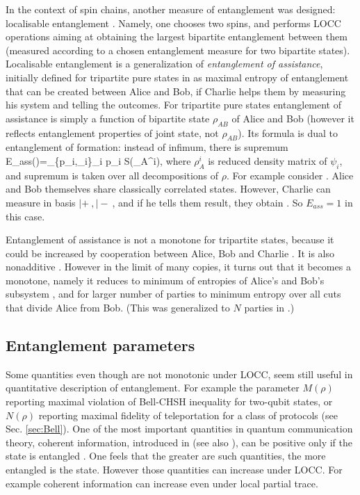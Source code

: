 \documentclass[twocolumn,aps,rmp]{revtex4}
\begin{document}
In the context of spin chains, another measure of entanglement was
designed: localisable entanglement \cite{VerstraetePC2003-locent}. Namely,
one chooses two spins,
and  performs LOCC operations aiming at obtaining the largest
bipartite entanglement between them (measured according to a chosen
entanglement measure for two bipartite states). Localisable
entanglement is a generalization of {\it entanglement of
assistance}, initially defined for tripartite pure states in
\cite{entass} as maximal entropy of entanglement that can be created
between Alice and Bob, if Charlie helps them by measuring his system
and telling the outcomes. For tripartite pure states entanglement of
assistance is simply a function of bipartite state $\rho_{AB}$ of
Alice and Bob (however it reflects entanglement properties of joint
state, not $\rho_{AB}$). Its formula is dual to entanglement of
formation: instead of infimum, there is supremum \be
E_{ass}(\rho)=\sup_{\{p_i,\psi_i\}}\sum_i p_i S(\rho_A^i), \ee where
$\rho_A^i$ is reduced density matrix of $\psi_i$, and supremum is
taken over all decompositions of $\rho$. For example consider \ghzstate.
Alice and Bob themselves share classically correlated states.
However, Charlie can measure in basis $|+\>,|-\>$, and if he tells
them result, they obtain \eprpair. So $E_{ass}= 1$ in this case.

Entanglement of assistance is not a monotone for tripartite states,
because it could be increased by cooperation between Alice, Bob and
Charlie \cite{GourS2005-eass}. It is also nonadditive \cite{entass}.
However in the limit of many copies, it turns out that it becomes a
monotone, namely it reduces to minimum of entropies of Alice's and
Bob's subsystem \cite{svw2005}, and for larger number of parties to
minimum entropy over all cuts that divide Alice from Bob. (This was
generalized to $N$ parties in \cite{SW-nature,sw-long}.)





\subsection{Entanglement parameters}

Some quantities even though are not monotonic under LOCC, seem still
useful in quantitative description of entanglement. For example the
parameter $M(\rho)$ \cite{HHH1995-bell} reporting maximal violation of
Bell-CHSH inequality for two-qubit states, or $N(\rho)$ reporting
maximal fidelity of teleportation for a class of protocols
\cite{HHH1996-teleportation} (see Sec. \ref{sec:Bell}). One of the
most important quantities in quantum communication theory, coherent
information, introduced in \cite{SchumacherN-1996-pra} (see also
\cite{Lloyd-cap}), can be positive only if the state is entangled
\cite{RPH1994}. One feels that the greater are such quantities, the
more entangled is the state. However those quantities can increase
under LOCC. For example coherent information can increase even under
local partial trace.
\end{document}
